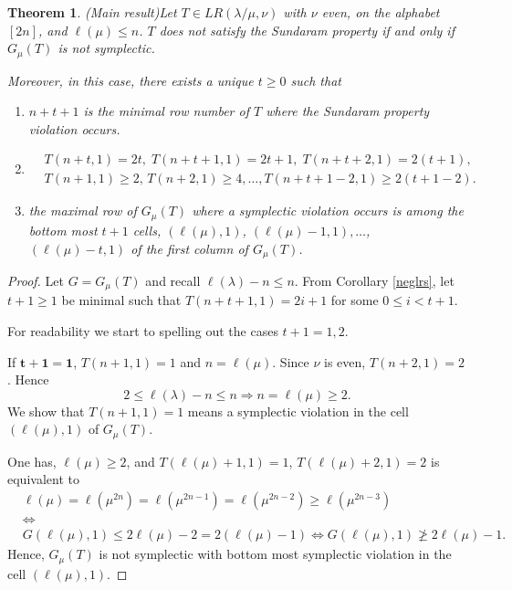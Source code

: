 \documentclass[reqno]{amsart}
\theoremstyle{tplain}
\newtheorem{thm}{Theorem}
\begin{document}
{\begin{thm}(Main result)\label{th:main} Let $T\in LR(\lambda/\mu,\nu)$ with $\nu$ even, on the alphabet $[2n]$, and $ \ell(\mu)\le n$.
 $T$ does not satisfy the Sundaram property if and only if $G_\mu(T)$ is not symplectic.

Moreover,  in this case, there exists a unique $t\ge 0$ such that
\begin{enumerate}

\item  ${n+t+1}$  is  the minimal row number of $T$ where the  Sundaram property  violation occurs.

\item
  \begin{align}&T(n+t,1)=2t,\; T(n+t+1,1)= 2t+1,\; T(n+t+2,1)=2(t+1),\\
 &T(n+1,1)\ge 2,\, T(n+2,1)\ge 4,\dots, T(n+t+1-2,1)\ge 2(t+1-2).
 \end{align}
 \item  the maximal row    of $G_\mu(T)$ where a symplectic violation  occurs is among the bottom most $t+1$ cells,  $(\ell(\mu),1)$,  $(\ell(\mu)-1,1),\dots$,  $ (\ell(\mu)-t,1) $ of the first column of $G_\mu(T)$.
\end{enumerate}
\end{thm}
\begin{proof} Let $ G=G_\mu(T)$ and recall $\ell(\lambda)-n\le n$. From Corollary \ref{neglrs}, let $t+1\ge 1$ be  minimal such that $T(n+t+1,1)=2i+1$ for some  $0\le i<t+1$.

For readability we start to spelling out the cases $t+1=1,2$.

If $\mathbf{t+1=1}$, $T(n+1,1)=1$  and $n=\ell(\mu)$. Since $\nu$ is even,  $T(n+2,1)=2$. Hence $$2\le \ell(\lambda)-n\le n\Rightarrow n=\ell(\mu)\ge 2.$$ We show that $T(n+1,1)=1$ means a symplectic violation in the cell $(\ell(\mu),1)$ of $G_\mu(T)$.

One has, $\ell(\mu)\ge 2$, and $T(\ell(\mu)+1,1)=1$,   $T(\ell(\mu)+2,1)=2$ is equivalent to
\begin{align}&\ell(\mu)=\ell(\mu^{2n})=\ell(\mu^{2n-1})=\ell(\mu^{2n-2})\ge\ell(\mu^{2n-3})\\
&\Leftrightarrow \\
&G(\ell(\mu),1)\le 2\ell(\mu)-2=2(\ell(\mu)-1)\Leftrightarrow G(\ell(\mu),1)\ngeq 2\ell(\mu)-1.
\end{align}
Hence,  $G_\mu(T)$ is not symplectic with bottom most symplectic violation in the cell $(\ell(\mu),1)$.



\end{proof}}
\end{document}
